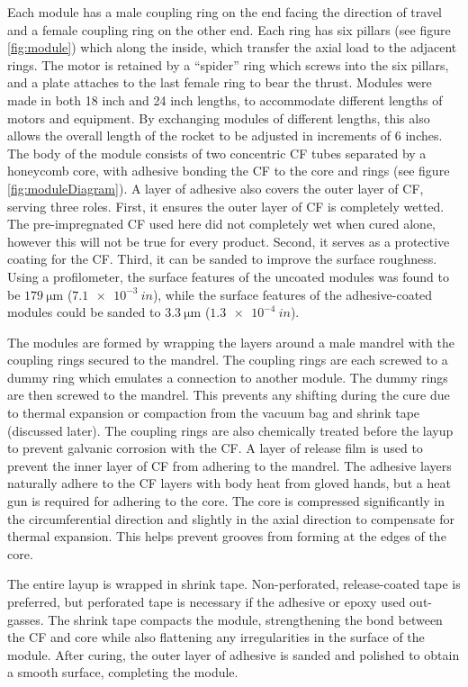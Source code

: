 \documentclass{aiaa-tc}%
\begin{document}
Each module has a male coupling ring on the end facing the direction of travel and a female coupling ring on the other end. 
Each ring has six pillars (see figure \ref{fig:module}) which along the inside, which transfer the axial load to the adjacent rings.
The motor is retained by a ``spider'' ring which screws into the six pillars, and a plate attaches to the last female ring to bear the thrust.
Modules were made in both 18 inch and 24 inch lengths, to accommodate different lengths of motors and equipment. 
By exchanging modules of different lengths, this also allows the overall length of the rocket to be adjusted in increments of 6 inches.
The body of the module consists of two concentric CF tubes separated by a honeycomb core, with adhesive bonding the CF to the core and rings (see figure \ref{fig:moduleDiagram}). 
A layer of adhesive also covers the outer layer of CF, serving three roles. First, it ensures the outer layer of CF is completely wetted. 
The pre-impregnated CF used here did not completely wet when cured alone, however this will not be true for every product.
Second, it serves as a protective coating for the CF. 
Third, it can be sanded to improve the surface roughness.
Using a profilometer, the surface features of the uncoated modules was found to be $\SI{179}{\micro\meter}$ ($\SI{7.1e-3}{in}$), while the surface features of the adhesive-coated modules could be sanded to $\SI{3.3}{\micro\meter}$ ($\SI{1.3e-4}{in}$).

The modules are formed by wrapping the layers around a male mandrel with the coupling rings secured to the mandrel.
The coupling rings are each screwed to a dummy ring which emulates a connection to another module. The dummy rings are then screwed to the mandrel.
This prevents any shifting during the cure due to thermal expansion or compaction from the vacuum bag and shrink tape (discussed later).
The coupling rings are also chemically treated before the layup to prevent galvanic corrosion with the CF.
A layer of release film is used to prevent the inner layer of CF from adhering to the mandrel. 
The adhesive layers naturally adhere to the CF layers with body heat from gloved hands, but a heat gun is required for adhering to the core. 
The core is compressed significantly in the circumferential direction and slightly in the axial direction to compensate for thermal expansion. This helps prevent grooves from forming at the edges of the core.

The entire layup is wrapped in shrink tape. Non-perforated, release-coated tape is preferred, but perforated tape is necessary if the adhesive or epoxy used out-gasses.
The shrink tape compacts the module, strengthening the bond between the CF and core while also flattening any irregularities in the surface of the module. 
After curing, the outer layer of adhesive is sanded and polished to obtain a smooth surface, completing the module. 
\end{document}
